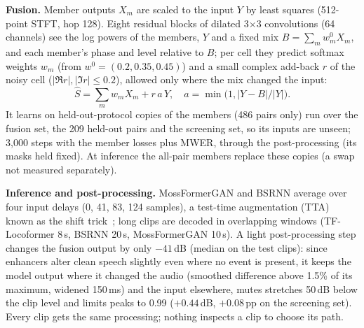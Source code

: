 \documentclass[conference]{IEEEtran}
\begin{document}
\begin{table}[t]
\caption{Pretrained models in the final system (exact versions in the repository).}
\label{tab:models}
\centering\scriptsize
\setlength{\tabcolsep}{2.5pt}
\end{table}

\textbf{Fusion.} Member outputs $X_m$ are scaled to the input $Y$ by least squares (512-point STFT, hop 128).
Eight residual blocks of dilated 3$\times$3 convolutions (64 channels) see the log powers of the members, $Y$ and a
fixed mix $B=\sum_m w^0_m X_m$, and each member's phase and level relative to $B$; per cell they predict softmax
weights $w_m$ (from $w^0=(0.2,0.35,0.45)$) and a small complex add-back $r$ of the noisy cell
($|\Re r|,|\Im r|\le0.2$), allowed only where the mix changed the input:
\begin{equation}
\hat{S}=\textstyle\sum_m w_m X_m + r\,a\,Y,\quad a=\min\!\big(1,|Y-B|/|Y|\big).
\end{equation}
It learns on held-out-protocol copies of the members (486 pairs only) run over the fusion set, the 209 held-out pairs
and the screening set, so its inputs are unseen; 3,000 steps with the member losses plus MWER, through the post-processing (its masks
held fixed). At
inference the all-pair members replace these copies (a swap not measured separately).

\textbf{Inference and post-processing.} MossFormerGAN and BSRNN average over four input delays (0, 41, 83, 124
samples), a test-time augmentation (TTA) known as the shift trick~\cite{demucs}; long clips are decoded in overlapping
windows (TF-Locoformer 8\,s, BSRNN 20\,s, MossFormerGAN 10\,s). A light post-processing step changes the fusion output
by only $-41$\,dB (median on the test clips): since enhancers alter clean speech slightly even where no event is
present, it keeps the model output where it changed the audio (smoothed difference above 1.5\% of its maximum, widened
150\,ms) and the input elsewhere, mutes stretches 50\,dB below the clip level and limits peaks to 0.99 ($+0.44$\,dB,
$+0.08$\,pp on the screening set). Every clip gets the same processing; nothing inspects a clip to choose its path.
\end{document}
